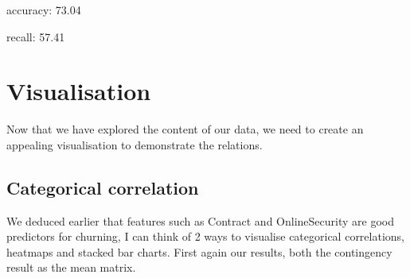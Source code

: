 \documentclass[letterpaper,10pt,english]{jupyterBook}
\begin{document}
\begin{sphinxVerbatim}[commandchars=\\\{\}]
\PYGZsq{}accuracy: 73.04\PYGZpc{}\PYGZsq{}
\end{sphinxVerbatim}

\begin{sphinxVerbatim}[commandchars=\\\{\}]
\PYG{p}{[}\PYG{p}{]}\PYG{p}{[}\PYG{p}{]}\PYG{p}{[}\PYG{p}{]}
\end{sphinxVerbatim}

\begin{sphinxVerbatim}[commandchars=\\\{\}]
\PYGZsq{}recall: 57.41\PYGZpc{}\PYGZsq{}
\end{sphinxVerbatim}


\section{Visualisation}
\label{\detokenize{c7_case_studies/Churn:visualisation}}
\sphinxAtStartPar
Now that we have explored the content of our data, we need to create an appealing visualisation to demonstrate the relations.


\subsection{Categorical correlation}
\label{\detokenize{c7_case_studies/Churn:categorical-correlation}}
\sphinxAtStartPar
We deduced earlier that features such as Contract and OnlineSecurity are good predictors for churning, I can think of 2 ways to visualise categorical correlations, heatmaps and stacked bar charts. First again our results, both the contingency result as the mean matrix.

\begin{sphinxVerbatim}[commandchars=\\\{\}]
\PYG{p}{[}\PYG{p}{]}\PYG{p}{[}\PYG{p}{]}
\end{sphinxVerbatim}
\end{document}

